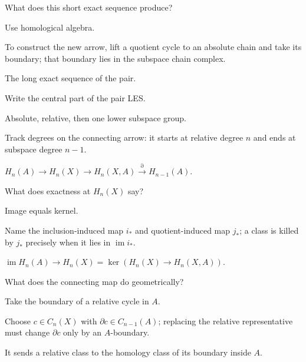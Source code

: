 \begin{exercise}\label{exr:viii19-07}
What does this short exact sequence produce?
\end{exercise}
\begin{hint}
Use homological algebra.

To construct the new arrow, lift a quotient cycle to an absolute chain and take its boundary; that boundary lies in the subspace chain complex.
\end{hint}
\begin{solution}
The long exact sequence of the pair.
\end{solution}

\begin{exercise}\label{exr:viii19-08}
Write the central part of the pair LES.
\end{exercise}
\begin{hint}
Absolute, relative, then one lower subspace group.

Track degrees on the connecting arrow: it starts at relative degree \(n\) and ends at subspace degree \(n-1\).
\end{hint}
\begin{solution}
\(H_n(A)\to H_n(X)\to H_n(X,A)\xrightarrow{\partial}H_{n-1}(A)\).
\end{solution}

\begin{exercise}\label{exr:viii19-09}
What does exactness at \(H_n(X)\) say?
\end{exercise}
\begin{hint}
Image equals kernel.

Name the inclusion-induced map \(i_*\) and quotient-induced map \(j_*\); a class is killed by \(j_*\) precisely when it lies in \(\operatorname{im}i_*\).
\end{hint}
\begin{solution}
\(\operatorname{im}H_n(A)\to H_n(X)=\ker(H_n(X)\to H_n(X,A))\).
\end{solution}

\begin{exercise}\label{exr:viii19-10}
What does the connecting map do geometrically?
\end{exercise}
\begin{hint}
Take the boundary of a relative cycle in \(A\).

Choose \(c\in C_n(X)\) with \(\partial c\in C_{n-1}(A)\); replacing the relative representative must change \(\partial c\) only by an \(A\)-boundary.
\end{hint}
\begin{solution}
It sends a relative class to the homology class of its boundary inside \(A\).
\end{solution}

